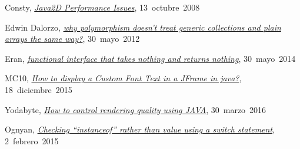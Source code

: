 Consty,
\href{https://stackoverflow.com/a/197060}{\textit{Java2D Performance Issues}},
\mbox{13 octubre 2008}

Edwin Dalorzo,
\href{https://stackoverflow.com/a/10816632}{\textit{why polymorphism doesn't treat generic collections and plain arrays the same way?}},
\mbox{30 mayo 2012}

Eran,
\href{https://stackoverflow.com/a/23958916}{\textit{functional interface that takes nothing and returns nothing}},
\mbox{30 mayo 2014}

MC10,
\href{https://stackoverflow.com/a/34347830}{\textit{How to display a Custom Font Text in a JFrame in java?}},
\mbox{18 diciembre 2015}

Yodabyte,
\href{https://stackoverflow.com/a/36316937}{\textit{How to control rendering quality using JAVA}},
\mbox{30 marzo 2016}

Ognyan,
\href{https://softwareengineering.stackexchange.com/a/271877}{\textit{Checking “instanceof” rather than value using a switch statement}},
\mbox{2 febrero 2015}